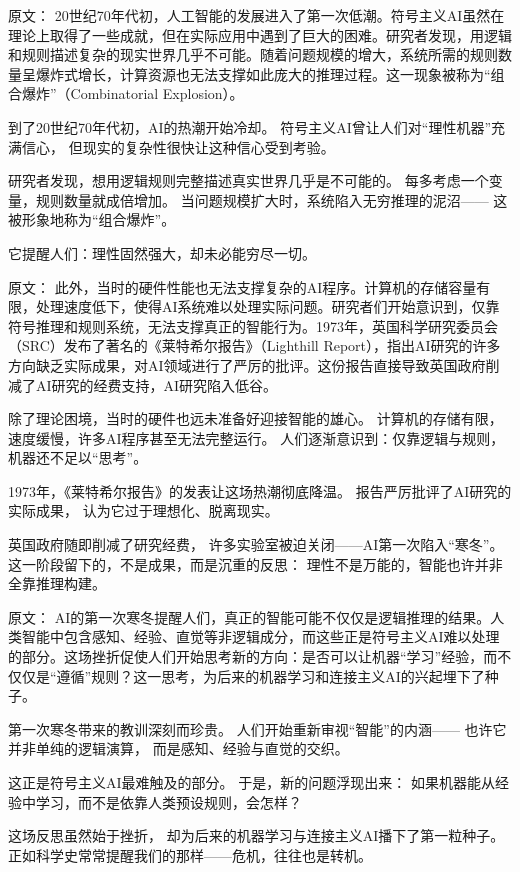 原文：
20世纪70年代初，人工智能的发展进入了第一次低潮。符号主义AI虽然在理论上取得了一些成就，但在实际应用中遇到了巨大的困难。研究者发现，用逻辑和规则描述复杂的现实世界几乎不可能。随着问题规模的增大，系统所需的规则数量呈爆炸式增长，计算资源也无法支撑如此庞大的推理过程。这一现象被称为“组合爆炸”（Combinatorial Explosion）。

到了20世纪70年代初，AI的热潮开始冷却。
符号主义AI曾让人们对“理性机器”充满信心，
但现实的复杂性很快让这种信心受到考验。

研究者发现，想用逻辑规则完整描述真实世界几乎是不可能的。
每多考虑一个变量，规则数量就成倍增加。
当问题规模扩大时，系统陷入无穷推理的泥沼——
这被形象地称为“组合爆炸”。

它提醒人们：理性固然强大，却未必能穷尽一切。

原文：
此外，当时的硬件性能也无法支撑复杂的AI程序。计算机的存储容量有限，处理速度低下，使得AI系统难以处理实际问题。研究者们开始意识到，仅靠符号推理和规则系统，无法支撑真正的智能行为。1973年，英国科学研究委员会（SRC）发布了著名的《莱特希尔报告》（Lighthill Report），指出AI研究的许多方向缺乏实际成果，对AI领域进行了严厉的批评。这份报告直接导致英国政府削减了AI研究的经费支持，AI研究陷入低谷。

除了理论困境，当时的硬件也远未准备好迎接智能的雄心。
计算机的存储有限，速度缓慢，许多AI程序甚至无法完整运行。
人们逐渐意识到：仅靠逻辑与规则，机器还不足以“思考”。

1973年，《莱特希尔报告》的发表让这场热潮彻底降温。
报告严厉批评了AI研究的实际成果，
认为它过于理想化、脱离现实。

英国政府随即削减了研究经费，
许多实验室被迫关闭——AI第一次陷入“寒冬”。
这一阶段留下的，不是成果，而是沉重的反思：
理性不是万能的，智能也许并非全靠推理构建。

原文：
AI的第一次寒冬提醒人们，真正的智能可能不仅仅是逻辑推理的结果。人类智能中包含感知、经验、直觉等非逻辑成分，而这些正是符号主义AI难以处理的部分。这场挫折促使人们开始思考新的方向：是否可以让机器“学习”经验，而不仅仅是“遵循”规则？这一思考，为后来的机器学习和连接主义AI的兴起埋下了种子。

第一次寒冬带来的教训深刻而珍贵。
人们开始重新审视“智能”的内涵——
也许它并非单纯的逻辑演算，
而是感知、经验与直觉的交织。

这正是符号主义AI最难触及的部分。
于是，新的问题浮现出来：
如果机器能从经验中学习，而不是依靠人类预设规则，会怎样？

这场反思虽然始于挫折，
却为后来的机器学习与连接主义AI播下了第一粒种子。
正如科学史常常提醒我们的那样——危机，往往也是转机。

